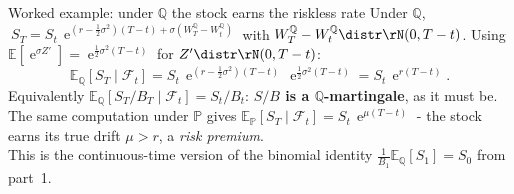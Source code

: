 \documentclass[pdf, handout]{beamer}
\newcommand{\e}{\operatorname{e}}
\begin{document}
\begin{frame}{Worked example: under $\mathbb{Q}$ the stock earns the riskless rate}
Under $\mathbb{Q}$, $\ S_T=S_t\,\e^{(r-\frac12\sigma^2)(T-t)+\sigma(W_T^{\mathbb{Q}}-W_t^{\mathbb{Q}})}$ with $W_T^{\mathbb{Q}}-W_t^{\mathbb{Q}}\distr\rN(0,T-t)$. Using $\mathbb{E}[\e^{\sigma Z'}]=\e^{\frac12\sigma^2(T-t)}$ for $Z'\distr\rN(0,T-t)$:
\[ \mathbb{E}_{\mathbb{Q}}[S_T\mid\mathcal{F}_t]=S_t\,\e^{(r-\frac12\sigma^2)(T-t)}\,\e^{\frac12\sigma^2(T-t)}=S_t\,\e^{r(T-t)}. \]
Equivalently $\mathbb{E}_{\mathbb{Q}}[S_T/B_T\mid\mathcal{F}_t]=S_t/B_t$: \textbf{$S/B$ is a $\mathbb{Q}$-martingale}, as it must be. The same computation under $\mathbb{P}$ gives $\mathbb{E}_{\mathbb{P}}[S_T\mid\mathcal{F}_t]=S_t\,\e^{\mu(T-t)}$ - the stock earns its true drift $\mu>r$, a \emph{risk premium}.
\\[3pt]
This is the continuous-time version of the binomial identity $\frac{1}{B_1}\mathbb{E}_{\mathbb{Q}}[S_1]=S_0$ from part~1.
\end{frame}
\end{document}

